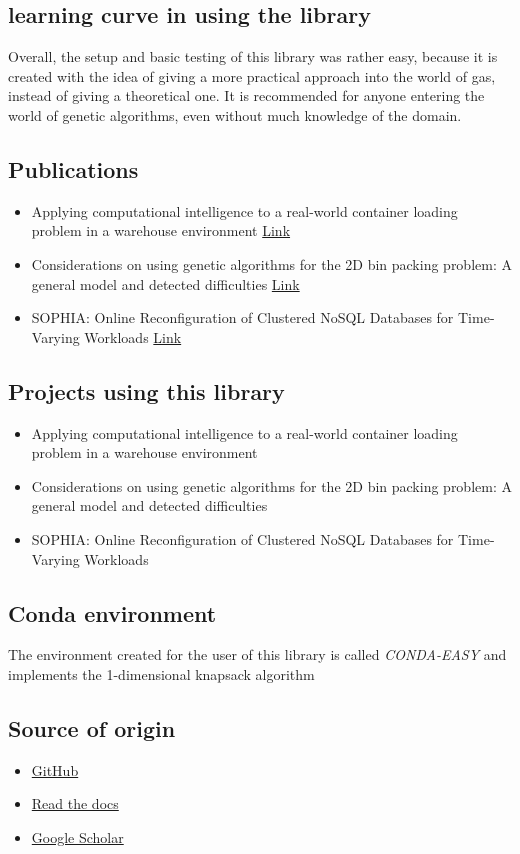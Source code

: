 \documentclass{article}
\begin{document}
	\subsection{learning curve in using the library}
	Overall, the setup and basic testing of this library was rather easy, because it is created with the idea of giving a more practical approach into the world of gas, instead of giving a theoretical one. It is recommended for anyone entering the world of genetic algorithms, even without much knowledge of the domain.
	\subsection{Publications}
	\begin{itemize}
		\item Applying computational intelligence to a real-world container loading problem in a warehouse environment \href{http://irep.ntu.ac.uk/id/eprint/33547/}{Link}
		\item Considerations on using genetic algorithms for the 2D bin packing problem: A general model and detected difficulties \href{https://ieeexplore.ieee.org/abstract/document/8107051}{Link}
		\item {SOPHIA}: Online Reconfiguration of Clustered NoSQL Databases for Time-Varying Workloads \href{https://www.usenix.org/conference/atc19/presentation/mahgoub}{Link}
	\end{itemize}
	\subsection{Projects using this library}
	\begin{itemize}
		\item Applying computational intelligence to a real-world container loading problem in a warehouse environment
		\item Considerations on using genetic algorithms for the 2D bin packing problem: A general model and detected difficulties
		\item {SOPHIA}: Online Reconfiguration of Clustered NoSQL Databases for Time-Varying Workloads
	\end{itemize}
	\subsection{Conda environment}
	The environment created for the user of this library is called \textit{CONDA-EASY} and implements the 1-dimensional knapsack algorithm
	\subsection{Source of origin}
	\begin{itemize}
		\item \href{https://github.com/remiomosowon/pyeasyga}{GitHub}
		\item \href{https://pyeasyga.readthedocs.io/en/latest/readme.html}{Read the docs}
		\item \href{https://scholar.google.com/scholar?hl=it&as_sdt=02C5&q=pyeasyga&btnG=}{Google Scholar}
		
	\end{itemize}
	
\end{document}
